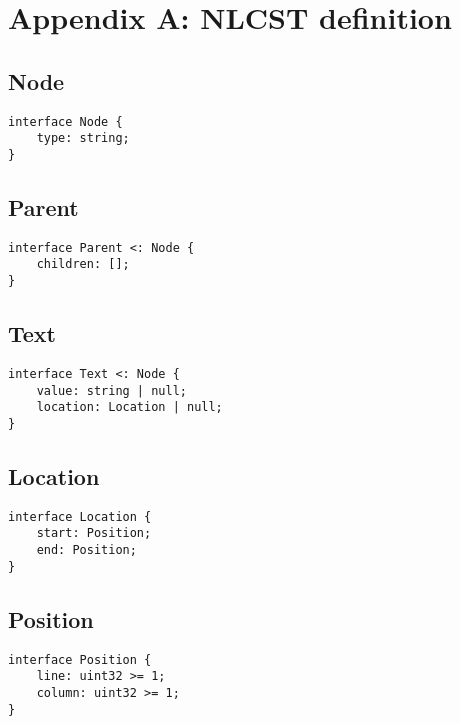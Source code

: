 
\chapter{Appendix A: NLCST definition}\label{apendix-a-nlcst-definition}

\section*{Node}\label{node}

\begin{lstlisting}[language=IDL]
interface Node {
    type: string;
}
\end{lstlisting}

\section*{Parent}\label{parent}

\begin{lstlisting}[language=IDL]
interface Parent <: Node {
    children: [];
}
\end{lstlisting}

\section*{Text}\label{text}

\begin{lstlisting}[language=IDL]
interface Text <: Node {
    value: string | null;
    location: Location | null;
}
\end{lstlisting}

\section*{Location}\label{location}

\begin{lstlisting}[language=IDL]
interface Location {
    start: Position;
    end: Position;
}
\end{lstlisting}

\section*{Position}\label{position}

\begin{lstlisting}[language=IDL]
interface Position {
    line: uint32 >= 1;
    column: uint32 >= 1;
}
\end{lstlisting}

